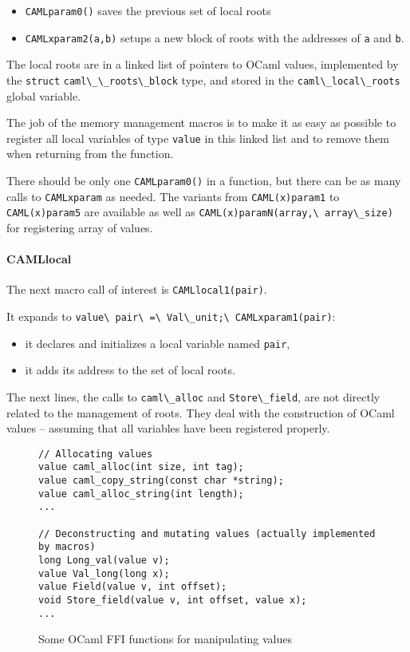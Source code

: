 \documentclass[a4paper]{easychair}
\newcommand{\cpp}[1]{\lstinline[style=C++]{#1}}
\begin{document}
\begin{itemize}
  \item \cpp{CAMLparam0()} saves the previous set of local roots 
  \item \cpp{CAMLxparam2(a,b)} setups a new block of roots with the
      addresses of \cpp{a} and \cpp{b}.
\end{itemize}

The local roots are in a linked list of pointers to OCaml values,
implemented by the \cpp{struct} \cpp{caml\_\_roots\_block} type, and
stored in the \cpp{caml\_local\_roots} global variable.

The job of the memory management macros is to make it as easy as
possible to register all local variables of type \cpp{value} in this
linked list and to remove them when returning from the function.

There should be only one \cpp{CAMLparam0()} in a function, but there
can be as many calls to \cpp{CAMLxparam} as needed. The variants from
\cpp{CAML(x)param1} to \cpp{CAML(x)param5} are available as well as
\cpp{CAML(x)paramN(array,\ array\_size)} for registering array of values.

\paragraph{CAMLlocal} The next macro call of interest is
\cpp{CAMLlocal1(pair)}. 

It expands to \cpp{value\ pair\ =\ Val\_unit;\ CAMLxparam1(pair)}:
%
\begin{itemize}
\item it declares and initializes a local variable named \cpp{pair},
\item it adds its address to the set of local roots.
\end{itemize}

The next lines, the calls to \cpp{caml\_alloc} and
\cpp{Store\_field}, are not directly related to the management of
roots. They deal with the construction of OCaml values -- assuming that
all variables have been registered properly.

\begin{figure}[htbp]
\begin{lstlisting}[style=C++]
// Allocating values
value caml_alloc(int size, int tag);
value caml_copy_string(const char *string);
value caml_alloc_string(int length);
...
    
// Deconstructing and mutating values (actually implemented by macros)
long Long_val(value v);
value Val_long(long x);
value Field(value v, int offset); 
void Store_field(value v, int offset, value x);
...
\end{lstlisting}
  \caption{Some OCaml FFI functions for manipulating values}
  \label{fig:mlvalue}
\end{figure}
\end{document}
